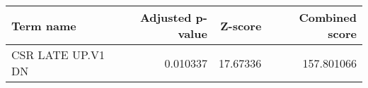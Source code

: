 \begin{tabular}{lrrr}
\toprule
        Term name &  Adjusted p-value &  Z-score &  Combined score \\
\midrule
CSR LATE UP.V1 DN &          0.010337 & 17.67336 &      157.801066 \\
\bottomrule
\end{tabular}

